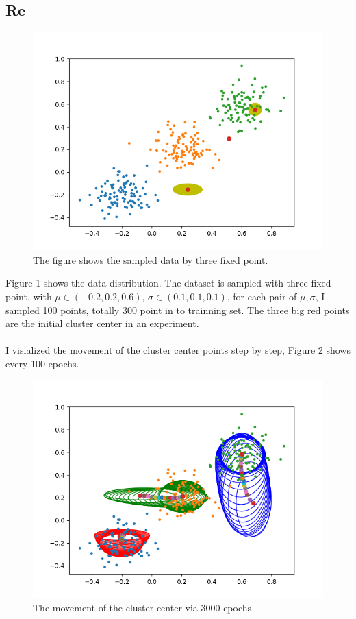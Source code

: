 \documentclass[a4paper]{article}
\begin{document}
\subsection{Re}
\begin{figure}[!htbp]
\begin{center}
\includegraphics[width=16cm]{imgs/100_learn.png}
\end{center}
\caption{The figure shows the sampled data by three fixed point.}\label{datavis}
\end{figure}
Figure 1 shows the data distribution. The dataset is sampled with three fixed point, with $\mu \in (-0.2, 0.2, 0.6)$, $\sigma \in (0.1, 0.1, 0.1)$, for each pair of $\mu , \sigma$, I sampled 100 points, totally 300 point in to trainning set. The three big red points are the initial cluster center in an experiment.
\\\\
I visialized the movement of the cluster center points step by step, Figure 2 shows every 100 epochs.

\begin{figure}[!htbp]
\begin{center}
\includegraphics[width=16cm]{imgs/change_learn-2.png}
\end{center}
\caption{The movement of the cluster center via 3000 epochs}\label{changed}
\end{figure}
\end{document}
